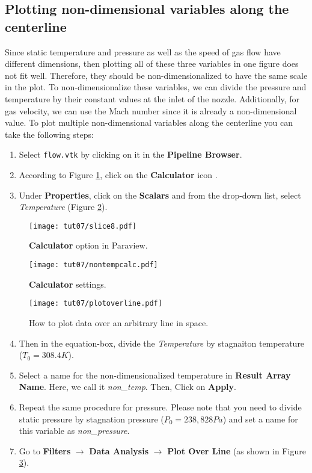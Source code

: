 \subsection{Plotting non-dimensional variables along the centerline}
Since static temperature and pressure as well as the speed of gas flow have different dimensions, then plotting all of these three variables in one figure does not fit well. Therefore, they should be non-dimensionalized to have the same scale in the plot. To non-dimensionalize these variables, we can divide the pressure and temperature by their constant values at the inlet of the nozzle. Additionally, for gas velocity, we can use the Mach number since it is already a non-dimensional value. To plot multiple non-dimensional variables along the centerline you can take the following steps:
\begin{enumerate}[label=\arabic*)]
	\setcounter{enumi}{0}
	\item Select \texttt{flow.vtk} by clicking on it in the \textbf{Pipeline Browser}.
	\item According to Figure \ref{fig7:calculator}, click on the \textbf{Calculator} icon .
	\item Under \textbf{Properties}, click on the \textbf{Scalars} and from the drop-down list, select \textit{Temperature} (Figure \ref{fig7:calculator2}).	
\end{enumerate}
\begin{figure}[ht]
	\centering
	\texttt{[image: tut07/slice8.pdf]}
	\caption{\textbf{Calculator} option in Paraview.}
	\label{fig7:calculator}
\end{figure}
\begin{figure}[ht]
	\centering
	\texttt{[image: tut07/nontempcalc.pdf]}
	\caption{\textbf{Calculator} settings.}
	\label{fig7:calculator2}
\end{figure}
\begin{figure}[H]
	\centering
	\texttt{[image: tut07/plotoverline.pdf]}
	\caption{How to plot data over an arbitrary line in space.}
	\label{fig7:plot_over_line}
\end{figure}
\begin{enumerate}[label=\arabic*)]
	\setcounter{enumi}{3}
	\item Then in the equation-box, divide the \textit{Temperature} by stagnaiton temperature ($T_{0}=308.4 K$).
	\item Select a name for the non-dimensionalized temperature in \textbf{Result Array Name}. Here, we call it \textit{non\_temp}. Then, Click on \textbf{Apply}.
	\item Repeat the same procedure for pressure. Please note that you need to divide static pressure by stagnation pressure ($P_{0}=238,828 Pa$) and set a name for this variable as \textit{non\_pressure}.
	\item Go to \textbf{Filters} $\rightarrow$  \textbf{Data Analysis} $\rightarrow$  \textbf{Plot Over Line} (as shown in Figure \ref{fig7:plot_over_line}).
\end{enumerate}
